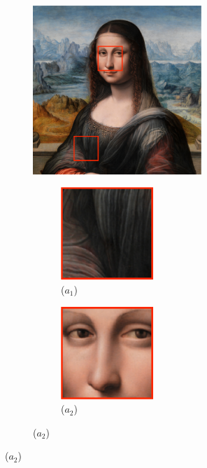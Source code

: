 \begin{figure}
	\centering
	\begin{subfigure}{0.45\textwidth}
		\centering
		\includegraphics[width=0.7\textwidth]{images/mrf-1}
		\caption*{($a$)}
		
		\begin{subfigure}{0.45\textwidth}
			\centering
			\includegraphics[width=0.5\textwidth]{images/mrf-1-1}
			\caption*{($a_1$)}
		\end{subfigure}
		\hfill
		\begin{subfigure}{0.45\textwidth}
			\centering
			\includegraphics[width=0.5\textwidth]{images/mrf-1-2}
			\caption*{($a_2$)}
		\end{subfigure}
		

\end{subfigure}
\end{figure}
